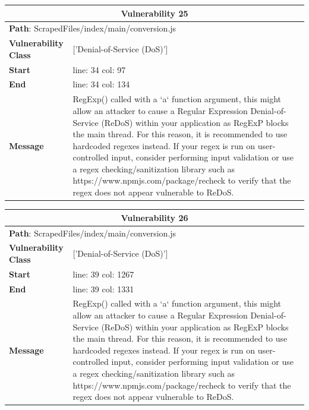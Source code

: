 \documentclass[12pt]{article}
\begin{document}
\vspace{0.7cm}
\FloatBarrier
\begin{table}[!h]
\centering
\renewcommand{\arraystretch}{1.3}
\begin{tabular}{|l|p{10cm}|}
\hline
\multicolumn{2}{|c|}{\textbf{Vulnerability 25}} \\
\hline
\multicolumn{2}{|l|}{\textbf{Path}: ScrapedFiles/index/main/conversion.js} \\
\hline
\textbf{Vulnerability Class} & ['Denial-of-Service (DoS)'] \\
\hline
\textbf{Start} & line: 34 \quad col: 97 \\
\hline
\textbf{End} & line: 34 \quad col: 134 \\
\hline
\textbf{Message} & RegExp() called with a `a` function argument, this might allow an attacker to cause a Regular Expression Denial-of-Service (ReDoS) within your application as RegExP blocks the main thread. For this reason, it is recommended to use hardcoded regexes instead. If your regex is run on user-controlled input, consider performing input validation or use a regex checking/sanitization library such as https://www.npmjs.com/package/recheck to verify that the regex does not appear vulnerable to ReDoS. \\
\hline
\end{tabular}
\end{table}
\vspace{0.7cm}
\FloatBarrier
\begin{table}[!h]
\centering
\renewcommand{\arraystretch}{1.3}
\begin{tabular}{|l|p{10cm}|}
\hline
\multicolumn{2}{|c|}{\textbf{Vulnerability 26}} \\
\hline
\multicolumn{2}{|l|}{\textbf{Path}: ScrapedFiles/index/main/conversion.js} \\
\hline
\textbf{Vulnerability Class} & ['Denial-of-Service (DoS)'] \\
\hline
\textbf{Start} & line: 39 \quad col: 1267 \\
\hline
\textbf{End} & line: 39 \quad col: 1331 \\
\hline
\textbf{Message} & RegExp() called with a `a` function argument, this might allow an attacker to cause a Regular Expression Denial-of-Service (ReDoS) within your application as RegExP blocks the main thread. For this reason, it is recommended to use hardcoded regexes instead. If your regex is run on user-controlled input, consider performing input validation or use a regex checking/sanitization library such as https://www.npmjs.com/package/recheck to verify that the regex does not appear vulnerable to ReDoS. \\
\hline
\end{tabular}
\end{table}
\end{document}
